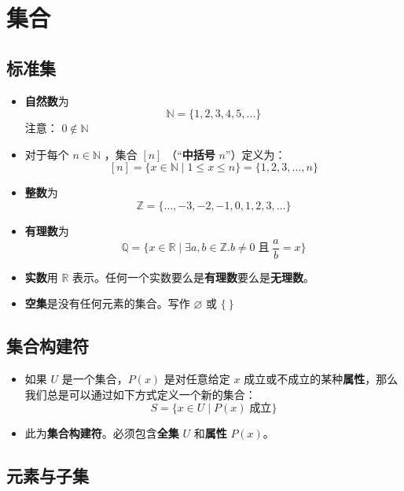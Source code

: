\section{集合}

\subsection{标准集}

\begin{itemize}
    \item \textbf{自然数}为
        \[\mathbb{N} = \{1,2,3,4,5,\dots\}\]
        注意： $0 \notin \mathbb{N}$
    \item 对于每个 $n \in \mathbb{N}$ ，集合 $[n]$ （``\textbf{中括号} $n$''）定义为：
        \[[n] = \{x \in \mathbb{N} \mid 1 \le x \le n\} = \{1,2,3,\dots,n\}\]
    \item \textbf{整数}为
        \[\mathbb{Z} = \{\dots,-3,-2,-1,0,1,2,3,\dots\}\]
    \item \textbf{有理数}为
        \[\mathbb{Q} = \{x \in \mathbb{R} \mid \exists a,b \in \mathbb{Z}. b \ne 0 \;\text{且}\; \frac{a}{b}=x\}\]
    \item \textbf{实数}用 $\mathbb{R}$ 表示。任何一个实数要么是\textbf{有理数}要么是\textbf{无理数}。
    \item \textbf{空集}是没有任何元素的集合。写作 $\varnothing$ 或 $\{\:\}$
\end{itemize}


\subsection{集合构建符}

\begin{itemize}
    \item 如果 $U$ 是一个集合，$P(x)$ 是对任意给定 $x$ 成立或不成立的某种\textbf{属性}，那么我们总是可以通过如下方式定义一个新的集合：
        \[S = \{x \in U \mid P(x) \;\text{成立}\}\]
    \item 此为\textbf{集合构建符}。必须包含\textbf{全集} $U$ 和\textbf{属性} $P(x)$。
\end{itemize}

\subsection{元素与子集}

